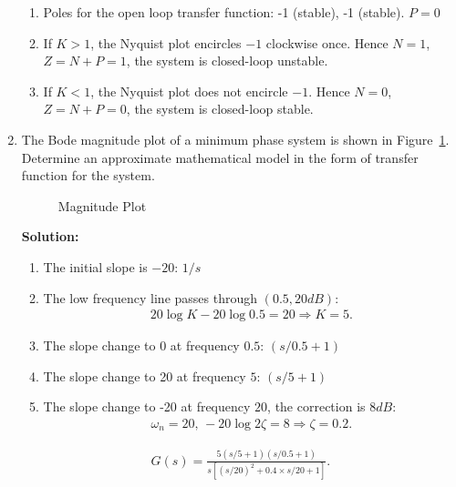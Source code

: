 \documentclass{article}
\newlength\figureheight
\newlength\figurewidth
\newcommand{\tikzdir}[1]{tikz/#1.tikz}
\newcommand{\inputtikz}[1]{}}
\begin{document}
\begin{enumerate}
\begin{enumerate}
  \item Poles for the open loop transfer function: -1 (stable), -1 (stable). $P=0$
  \item  If $K > 1$, the Nyquist plot encircles $-1$ clockwise once. Hence $N = 1$, $Z = N+P = 1$, the system is closed-loop unstable.
  \item  If $K < 1$, the Nyquist plot does not encircle $-1$. Hence $N = 0$, $Z = N+P = 0$, the system is closed-loop stable.
  \end{enumerate}

  \begin{figure}[h]
    \setlength\figureheight{4cm}
    \setlength\figurewidth{8cm}
    \centering
    \inputtikz{Quiz24Nyquist}
  \end{figure}
  \newpage
\item The Bode magnitude plot of a minimum phase system is shown in Figure~\ref{fig:1}. Determine an approximate mathematical model in the form of transfer function for the system.
  \begin{figure}[ht]
    \setlength\figureheight{8cm}
    \setlength\figurewidth{14cm}
    \centering
    \inputtikz{Quiz25}
    \caption{Magnitude Plot\label{fig:1}}
  \end{figure}

  {\bf Solution:}
  \begin{enumerate}
  \item The initial slope is $-20$: $1/s$
  \item The low frequency line passes through $(0.5,20dB)$:
    \begin{align*}
      20\log K - 20 \log 0.5 = 20\Rightarrow K = 5.
    \end{align*}
  \item The slope change to 0 at frequency $0.5$: $(s/0.5+1)$
  \item The slope change to 20 at frequency $5$: $(s/5+1)$
  \item The slope change to -20 at frequency $20$, the correction is $8dB$:
    \begin{align*}
      \omega_n = 20,\,-20\log 2\zeta = 8 \Rightarrow \zeta = 0.2.
    \end{align*}
  \end{enumerate}
\begin{align*}
  G(s) = \frac{5(s/5+1)(s/0.5+1)}{s\left[(s/20)^2+0.4\times s/20+1\right]}.
\end{align*}



\end{enumerate}
\end{document}
